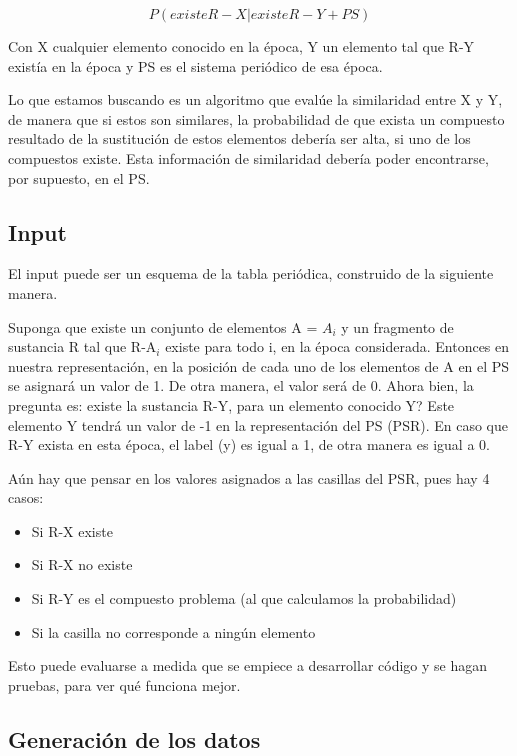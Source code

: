 \documentclass[twoside,twocolumn]{article}
\begin{document}
\begin{equation}
\label{eq:eq1}
P ( existe R-X |  existe R-Y  + PS )
\end{equation}

Con X cualquier elemento conocido en la \'epoca, Y un elemento tal que R-Y exist\'ia en la \'epoca y PS es el sistema peri\'odico de esa \'epoca.

Lo que estamos buscando es un algoritmo que eval\'ue la similaridad entre X y Y, de manera que si estos son similares, la probabilidad de que exista un compuesto resultado de la sustituci\'on de estos elementos deber\'ia ser alta, si uno de los compuestos existe. Esta informaci\'on de similaridad deber\'ia poder encontrarse, por supuesto, en el PS.

\subsection{Input}

El input puede ser un esquema de la tabla peri\'odica, construido de la siguiente manera.

Suponga que existe un conjunto de elementos A = {$A_i$} y un fragmento de sustancia R tal que R-A$_i$ existe para todo i, en la \'epoca considerada. Entonces en nuestra representaci\'on, en la posici\'on de cada uno de los elementos de A en el PS se asignar\'a un valor de 1. De otra manera, el valor ser\'a de 0. Ahora bien, la pregunta es: existe la sustancia R-Y, para un elemento conocido Y? 
Este elemento Y tendr\'a un valor de -1 en la representaci\'on del PS (PSR).
En caso que R-Y exista en esta \'epoca, el label (y) es igual a 1, de otra manera es igual a 0.

A\'un hay que pensar en los valores asignados a las casillas del PSR, pues hay 4 casos:

\begin{itemize}
	\item Si R-X existe
	\item Si R-X no existe
	\item Si R-Y es el compuesto problema (al que calculamos la probabilidad)
	\item Si la casilla no corresponde a ning\'un elemento
\end{itemize}

Esto puede evaluarse a medida que se empiece a desarrollar c\'odigo y se hagan pruebas, para ver qu\'e funciona mejor.

\subsection{Generaci\'on de los datos}
\end{document}
